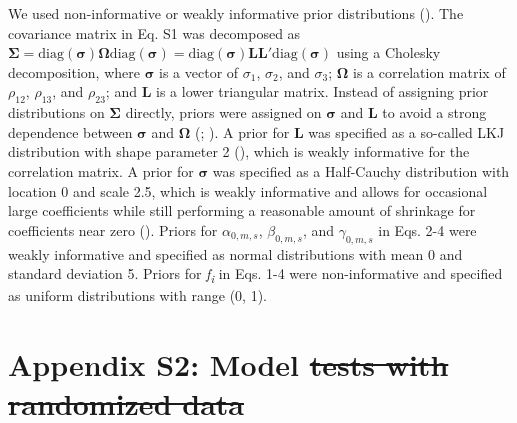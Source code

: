 \documentclass[
  12pt,
  letterpaper,
  DIV=11,
  numbers=noendperiod]{scrartcl}
\providecommand{\DIFadd}[1]{{\protect\color{blue}\uwave{#1}}} %
\providecommand{\DIFdel}[1]{{\protect\color{red}\sout{#1}}}                      %
\providecommand{\DIFaddbegin}{} %
\providecommand{\DIFdelbegin}{} %
\providecommand{\DIFdelend}{} %
\newcommand{\DIFscaledelfig}{0.5}
\newlength{\DIFdelgraphicswidth} %
\newlength{\DIFdelgraphicsheight} %
\newcommand{\DIFaddincludegraphics}[2][]{{\color{blue}\fbox{\DIFOincludegraphics[#1]{#2}}}} %
\newcommand{\DIFdelincludegraphics}[2][]{%
\sbox{\DIFdelgraphicsbox}{\DIFOincludegraphics[#1]{#2}}%
\settoboxwidth{\DIFdelgraphicswidth}{\DIFdelgraphicsbox} %
\settoboxtotalheight{\DIFdelgraphicsheight}{\DIFdelgraphicsbox} %
\scalebox{\DIFscaledelfig}{%
\parbox[b]{\DIFdelgraphicswidth}{\usebox{\DIFdelgraphicsbox}\\[-\baselineskip] \rule{\DIFdelgraphicswidth}{0em}}\llap{\resizebox{\DIFdelgraphicswidth}{\DIFdelgraphicsheight}{%
\setlength{\unitlength}{\DIFdelgraphicswidth}%
\begin{picture}(1,1)%
\thicklines\linethickness{2pt} %
{\color[rgb]{1,0,0}\put(0,0){\framebox(1,1){}}}%
{\color[rgb]{1,0,0}\put(0,0){\line( 1,1){1}}}%
{\color[rgb]{1,0,0}\put(0,1){\line(1,-1){1}}}%
\end{picture}%
}\hspace*{3pt}}} %
} %
\DeclareRobustCommand{\DIFaddbegin}{\DIFOaddbegin \let\includegraphics\DIFaddincludegraphics} %
\DeclareRobustCommand{\DIFdelbegin}{\DIFOdelbegin \let\includegraphics\DIFdelincludegraphics} %
\DeclareRobustCommand{\DIFdelend}{\DIFOaddend \let\includegraphics\DIFOincludegraphics} %
\begin{document}
We used non-informative or weakly informative prior distributions
(). The covariance matrix in
Eq. S1 was decomposed as
\({\boldsymbol \Sigma} = \mathrm {diag}(\boldsymbol {\sigma}){\boldsymbol \Omega}\mathrm {diag}({\boldsymbol \sigma}) = \mathrm {diag}({\boldsymbol \sigma}){\boldsymbol L}{\boldsymbol L}\prime \mathrm {diag}({\boldsymbol \sigma})\)
using a Cholesky decomposition, where \(\boldsymbol {\sigma}\) is a
vector of \(\sigma_{1}\), \(\sigma_{2}\), and \(\sigma_{3}\);
\({\boldsymbol \Omega}\) is a correlation matrix of \(\rho_{12}\),
\(\rho_{13}\), and \(\rho_{23}\); and \textbf{L} is a lower triangular
matrix. Instead of assigning prior distributions on
\(\boldsymbol{\Sigma}\) directly, priors were assigned on
\({\boldsymbol \sigma}\) and \textbf{L} to avoid a strong dependence
between \({\boldsymbol \sigma}\) and \({\boldsymbol \Omega}\)
(;
). A prior for
\textbf{L} was specified as a so-called LKJ distribution with shape
parameter 2 (),
which is weakly informative for the correlation matrix. A prior for
\(\boldsymbol{\sigma}\) was specified as a Half-Cauchy distribution with
location 0 and scale 2.5, which is weakly informative and allows for
occasional large coefficients while still performing a reasonable amount
of shrinkage for coefficients near zero
(). Priors for
\(\alpha_{0,m,s}\), \(\beta_{0,m,s}\), and \(\gamma_{0,m,s}\) in Eqs.
2-4 were weakly informative and specified as normal distributions with
mean 0 and standard deviation 5. Priors for \emph{f\textsubscript{i}} in
Eqs. 1-4 were non-informative and specified as uniform distributions
with range (0, 1).

\newpage

\section{Appendix S2: Model
\DIFdelbegin \DIFdel{tests with randomized data }\DIFdelend \DIFaddbegin \DIFadd{constraints}}\label{appendix-s2-model-constraints}
\end{document}
